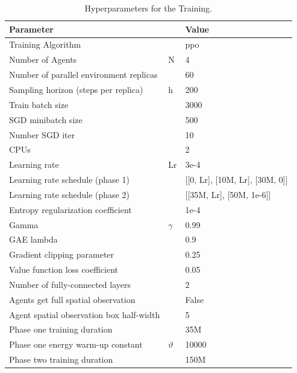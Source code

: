 \begin{table}[]
    \centering
    \begin{tabular}{lll}
    \hline
    Parameter                    &  & Value \\ \hline
    Training Algorithm               &  & ppo \\
    Number of Agents & N & 4\\
    Number of parallel environment replicas                &  & 60    \\
    Sampling horizon (steps per replica)               & h & 200   \\
    Train batch size && 3000\\
    SGD minibatch size     &  & 500 \\
    Number SGD iter      &  & 10    \\
    CPUs                   &  & 2  \\ \hline
    Learning rate                & Lr & 3e-4   \\
            Learning rate schedule (phase 1)      &  & [[0, Lr], [10M, Lr], [30M, 0]] \\
        Learning rate schedule (phase 2)      &  &[[35M, Lr], [50M, 1e-6]]\\
    Entropy regularization coefficient                  &  & 1e-4 \\
    Gamma                 & $\gamma$ & 0.99  \\
    GAE lambda           &  & 0.9    \\
   Gradient clipping parameter         &  & 0.25    \\
    Value function loss coefficient             &  & 0.05   \\ \hline
    Number of fully-connected layers  &  & 2   \\
    Agents get full spatial observation &  & False     \\
    Agent spatial observation box half-width          &  & 5   \\ \hline
    Phase one training duration &  & 35M  \\
    Phase one energy warm-up constant & $\vartheta$ & 10000  \\
    Phase two training duration  &  &  150M \\ \hline
    \end{tabular}
    \caption{\label{tab:hyperparameter_train}Hyperparameters for the Training.}
\end{table}

